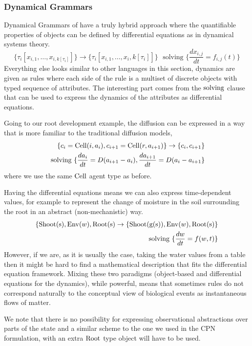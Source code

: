 \subsubsection*{Dynamical Grammars}
Dynamical Grammars of \citet{mjolsness2006stochastic} have a truly hybrid
approach where the quantifiable properties of objects can be defined by
differential equations as in dynamical systems theory.
$$
\{\tau_i[x_{i, 1}, \dots, x_{i, k[\tau_i]}] \} \rightarrow \{\tau_i[x_{i, 1}, \dots, x_i, k[\tau_i]]\} \, \,
\text{ solving } \{\frac{dx_{i,j}}{dt}=f_{i, j}(t)\}
$$
Everything else looks similar to other languages in this section, dynamics are
given as rules where each side of the rule is a multiset of discrete objects
with typed sequence of attributes. The interesting part comes from the
$\mathrm{solving}$ clause that can be used to express the dynamics of the attributes
as differential equations.

Going to our root development example, the diffusion can be expressed in a way
that is more familiar to the traditional diffusion models,
\begin{align*}
\{c_i=\mathrm{Cell}(i, a_i), c_{i+1}=\mathrm{Cell}(r, a_{i+1})\} \rightarrow \{c_i,
  c_{i+1}\} \\
  \text{ solving }\{\frac{da_i}{dt}=D(a_{i+1}-a_i),
  \frac{da_{i+1}}{dt}=D(a_i - a_{i+1} \}
\end{align*}
where we use the same $\mathrm{Cell}$ agent type as before.

Having the differential equations means we can also express time-dependent
values, for example to represent the change of moisture in the soil surrounding
the root in an abstract (non-mechanistic) way.
\begin{align*}
\{\mathrm{Shoot(s)}, \mathrm{Env}(w), \mathrm{Root(s)} \rightarrow \{\mathrm{Shoot(g(s))}, \mathrm{Env}(w),
  \mathrm{Root(s)} \} \\
  \text{ solving }\{\frac{dw}{dt}=f(w, t) \}
\end{align*}
However, if we are, as it is usually the case, taking the water values from a
table then it might be hard to find a mathematical description that fits the
differential equation framework. Mixing these two paradigms (object-based and
differential equations for the dynamics), while powerful, means that sometimes
rules do not correspond naturally to the conceptual view of biological events as
instantaneous flows of matter.

We note that there is no possibility for expressing observational abstractions
over parts of the state and a similar scheme to the one we used in the CPN
formulation, with an extra $\mathrm{Root}$ type object will have to be used.


